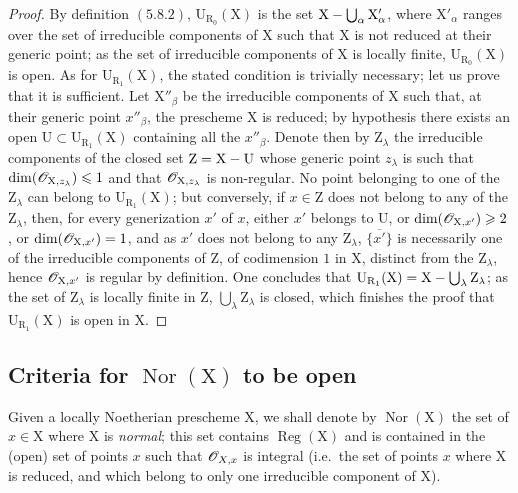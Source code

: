 \begin{proof}
By definition $(5.8.2)$, $\mathrm{U}_{\mathrm{R}_0}(\mathrm{X})$ is the set $\mathrm{X}-\bigcup_\alpha\mathrm{X}'_\alpha$, where $\mathrm{X}'_\alpha$ ranges over the set of
irreducible components of $\mathrm{X}$ such that $\mathrm{X}$ is not reduced at their generic point;
as the set of irreducible components of $\mathrm{X}$ is locally finite, $\mathrm{U}_{\mathrm{R}_0}(\mathrm{X})$ is
open. As for $\mathrm{U}_{\mathrm{R}_1}(\mathrm{X})$, the stated condition is trivially necessary;
let us prove that it is sufficient. Let $\mathrm{X}''_\beta$ be the irreducible components of $\mathrm{X}$ such that,
at their generic point $x''_\beta$, the prescheme $\mathrm{X}$ is reduced; by hypothesis there exists an open
$\mathrm{U}\subset\mathrm{U}_{\mathrm{R}_1}(\mathrm{X})$ containing all the $x''_\beta$. Denote then by $\mathrm{Z}_\lambda$ the irreducible components
of the closed set $\mathrm{Z}=\mathrm{X}-\mathrm{U}$ whose generic point $z_\lambda$ is such that $\dim(\mathscr{O}_{\mathrm{X},z_\lambda})\leqslant 1$
and that $\mathscr{O}_{\mathrm{X},z_\lambda}$ is non-regular. No point belonging to one of the $\mathrm{Z}_\lambda$ can belong
to $\mathrm{U}_{\mathrm{R}_1}(\mathrm{X})$; but conversely, if $x\in\mathrm{Z}$ does not belong to any of the $\mathrm{Z}_\lambda$, then, for every
generization $x'$ of $x$, either $x'$ belongs to $\mathrm{U}$, or
$\dim(\mathscr{O}_{\mathrm{X},x'})\geqslant 2$, or
$\dim(\mathscr{O}_{\mathrm{X},x'})=1$, and as $x'$ does not belong to any $\mathrm{Z}_\lambda$, $\overline{\{x'\}}$ is necessarily
one of the irreducible components of $\mathrm{Z}$, of codimension $1$ in $\mathrm{X}$, distinct from the $\mathrm{Z}_\lambda$, hence $\mathscr{O}_{\mathrm{X},x'}$
is regular by definition. One concludes that $\mathrm{U}_{\mathrm{R}_1}(\mathrm{X})=\mathrm{X}-\bigcup_\lambda\mathrm{Z}_\lambda$; as the set of
$\mathrm{Z}_\lambda$ is locally finite in $\mathrm{Z}$, $\bigcup_\lambda\mathrm{Z}_\lambda$ is closed, which finishes the proof that $\mathrm{U}_{\mathrm{R}_1}(\mathrm{X})$
is open in $\mathrm{X}$.
\end{proof}

\subsection{Criteria for \texorpdfstring{$\operatorname{Nor}(\mathrm{X})$}{Nor(X)} to be open}
\label{subsection:IV.6.13}
\label{IV.6.13}

\begin{env}[6.13.1]
\label{IV.6.13.1}
Given a locally Noetherian prescheme $\mathrm{X}$, we shall denote by
$\operatorname{Nor}(\mathrm{X})$ the set of $x\in\mathrm{X}$ where $\mathrm{X}$ is \emph{normal}; this set contains $\operatorname{Reg}(\mathrm{X})$ and is
contained in the (open) set of points $x$ such that $\mathscr{O}_{X,x}$ is integral (i.e.\ the set
of points $x$ where $\mathrm{X}$ is reduced, and which belong to only one irreducible component
of $\mathrm{X}$).
\end{env}

